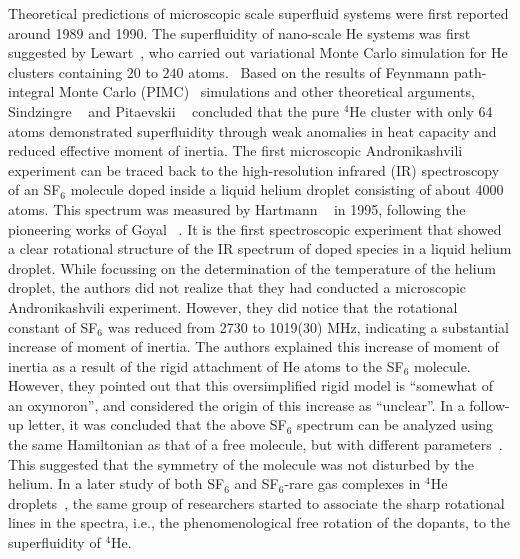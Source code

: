\documentclass[12pt]{iopart}
\begin{document}
Theoretical predictions of microscopic scale superfluid systems were first reported around 1989 and 1990. 
The superfluidity of nano-scale He systems was first suggested by Lewart~\etal, who carried out variational Monte Carlo simulation for He clusters containing $20$ to $240$ atoms.~\cite{lewart_liquid-helium}
Based on the results of  Feynmann path-integral Monte Carlo (PIMC)~\cite{ceperley_rmp_1995} simulations and other theoretical arguments, Sindzingre \etal~\cite{ceperley_area_estim} and Pitaevskii \etal~\cite{He_cluster_superflu} concluded that the pure $^4$He cluster with only 64 atoms demonstrated superfluidity through weak anomalies in heat capacity and reduced effective moment of inertia. 
The first microscopic Andronikashvili experiment can be traced back to the high-resolution infrared (IR) spectroscopy of an SF$_6$ molecule doped inside a liquid helium droplet consisting of about 4000 atoms. 
This spectrum was measured by Hartmann \etal~\cite{vilesov_sf6} in 1995, following the pioneering works of Goyal \etal~\cite{goyal_sf6_he_prl,goyal_sf6_he}.
It is the first spectroscopic experiment that showed a clear rotational structure of the IR spectrum of  doped species in a liquid helium droplet. 
While focussing on the determination of the temperature of the helium droplet, the authors did not realize that they had conducted a microscopic Andronikashvili experiment. 
However, they did notice that the rotational constant of SF$_6$ was reduced from 2730 to 1019(30) MHz, indicating a substantial increase of moment of inertia. 
The authors explained this increase of moment of inertia as a result of the rigid attachment of He atoms to the SF$_6$ molecule. 
However, they pointed out that this oversimplified rigid model is ``somewhat of an oxymoron'', and considered the origin of this increase as ``unclear''.  
In a follow-up letter, it was concluded that the above SF$_6$ spectrum can be analyzed using the same Hamiltonian as that of a free molecule, but with different parameters~\cite{vilesov_SF6_theory}.
This suggested that  the symmetry of the molecule was not disturbed by the helium. 
In a later study of both SF$_6$ and SF$_6$-rare gas complexes in $^4$He droplets~\cite{hartmann_sf6-rg}, the same group of researchers started to associate the sharp rotational lines in the spectra, i.e., the phenomenological free rotation of the dopants, to the superfluidity of $^4$He.
\end{document}

